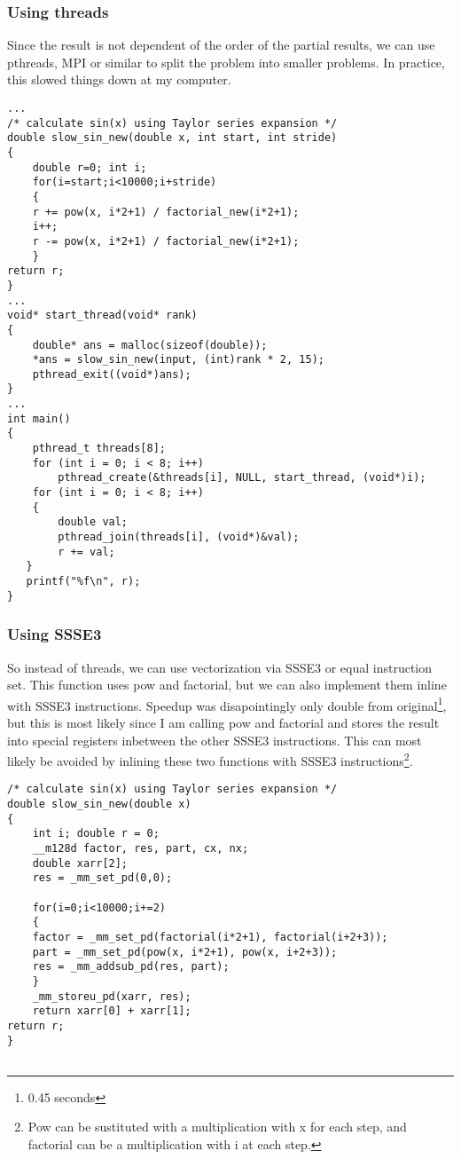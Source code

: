 \documentclass[english,a4paper,numbers=noenddot]{scrartcl}
\begin{document}
\subsubsection{Using threads}

Since the result is not dependent of the order of the partial results, we can use pthreads, MPI or similar to split the problem into smaller problems. In practice, this slowed things down at my computer.

\begin{lstlisting}
...
/* calculate sin(x) using Taylor series expansion */
double slow_sin_new(double x, int start, int stride)
{
    double r=0; int i;
    for(i=start;i<10000;i+stride)
    {
	r += pow(x, i*2+1) / factorial_new(i*2+1);
	i++;
	r -= pow(x, i*2+1) / factorial_new(i*2+1);
    }
return r;
}
...
void* start_thread(void* rank)
{
    double* ans = malloc(sizeof(double));
    *ans = slow_sin_new(input, (int)rank * 2, 15);
    pthread_exit((void*)ans);
}
...
int main()
{
    pthread_t threads[8];
    for (int i = 0; i < 8; i++)
        pthread_create(&threads[i], NULL, start_thread, (void*)i);
    for (int i = 0; i < 8; i++)
    {
        double val;
        pthread_join(threads[i], (void*)&val);
        r += val;
   }
   printf("%f\n", r);
}
\end{lstlisting}

\subsubsection{Using SSSE3}

So instead of threads, we can use vectorization via SSSE3 or equal instruction set.
This function uses pow and factorial, but we can also implement them inline with SSSE3 instructions. Speedup was disapointingly only double from original\footnote{0.45 seconds}, but this is most likely since I am calling
pow and factorial and stores the result into special registers inbetween the other SSSE3 instructions. This can most likely be avoided by inlining these two functions with SSSE3 instructions\footnote{Pow can be sustituted with a multiplication with x for each step, and factorial can be a multiplication with i at each step.
}.

\begin{lstlisting}
/* calculate sin(x) using Taylor series expansion */
double slow_sin_new(double x)
{
    int i; double r = 0;
    __m128d factor, res, part, cx, nx;
    double xarr[2];
    res = _mm_set_pd(0,0);

    for(i=0;i<10000;i+=2)
    {
	factor = _mm_set_pd(factorial(i*2+1), factorial(i+2+3));
	part = _mm_set_pd(pow(x, i*2+1), pow(x, i+2+3));
	res = _mm_addsub_pd(res, part);
    }
    _mm_storeu_pd(xarr, res);
    return xarr[0] + xarr[1];
return r;
}


\end{lstlisting}
\end{document}
